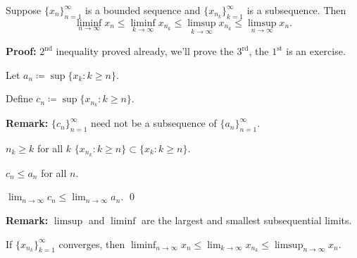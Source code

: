 \documentclass[10pt,aspectratio=149]{beamer}
\begin{document}
\begin{frame}
\begin{proposition}
Suppose $\{ x_n \}_{n=1}^\infty$ is a bounded sequence and
$\{ x_{n_k} \}_{k=1}^\infty$ is a subsequence.  Then
\begin{equation*}
\liminf_{n\to\infty} x_n \leq
\liminf_{k\to\infty} x_{n_k} \leq
\limsup_{k\to\infty} x_{n_k} \leq
\limsup_{n\to\infty} x_n .
\end{equation*}
\end{proposition}

\pause
\textbf{Proof:}
$2^{\text{nd}}$ inequality proved already,
we'll prove the $3^{\text{rd}}$,
the $1^{\text{st}}$ is an exercise.

\pause
\medskip

Let $a_n \coloneqq \sup \{ x_k : k \geq n \}$.

\pause
\medskip

Define $c_n \coloneqq \sup \{ x_{n_k} : k \geq n \}$.

\pause
\medskip

\textbf{Remark:} $\{ c_n \}_{n=1}^\infty$ need not be a subsequence of
$\{ a_n \}_{n=1}^\infty$.

\pause
\medskip

$n_k \geq k$ for all $k$ \wthus $\{ x_{n_k} : k \geq n \} \subset \{ x_k : k \geq n \}$.

\pause
\medskip

\thus \quad $c_n \leq a_n$ \quad for all $n$.

\pause
\medskip

\thus \quad
$\displaystyle \lim_{n\to\infty} c_n \leq \lim_{n\to\infty} a_n$.
\qed

\pause
\medskip

\textbf{Remark:}
$\limsup$ and $\liminf$ are the
largest and smallest subsequential limits.

\pause
If $\{ x_{n_k} \}_{k=1}^\infty$ converges, then
\quad
$\displaystyle \liminf_{n\to\infty} x_n \leq
\lim_{k\to\infty} x_{n_k} \leq
\limsup_{n\to\infty} x_n$.

\end{frame}
\end{document}
